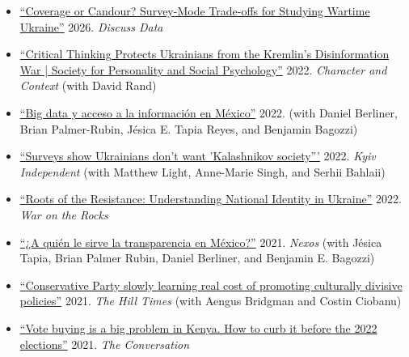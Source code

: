 \begin{itemize}[label={---},leftmargin=1.5em]
  \item \href{https://discuss-data.net/cs/eescca/section/blog/coverage-or-candour/}{``Coverage or Candour? Survey-Mode Trade-offs for Studying Wartime Ukraine''} 2026. \textit{Discuss Data}

  \item \href{https://spsp.org/news/character-and-context-blog/erlich-rand-critical-thinking-disinformation}{``Critical Thinking Protects Ukrainians from the Kremlin’s Disinformation War | Society for Personality and Social Psychology''} 2022. \textit{Character and Context} (with David Rand)

  \item \href{https://doi.org/10.31219/osf.io/nbqus}{``Big data y acceso a la información en México''} 2022. (with Daniel Berliner, Brian Palmer-Rubin, Jésica E. Tapia Reyes, and Benjamin Bagozzi)

  \item \href{https://kyivindependent.com/group-of-authors-surveys-show-ukrainians-dont-want-kalashnikov-society/}{``Surveys show Ukrainians don't want 'Kalashnikov society'''} 2022. \textit{Kyiv Independent} (with Matthew Light, Anne-Marie Singh, and Serhii Bahlaii)

  \item \href{https://warontherocks.com/2022/04/roots-of-the-resistance-understanding-national-identity-in-ukraine/}{``Roots of the Resistance: Understanding National Identity in Ukraine''} 2022. \textit{War on the Rocks}

  \item \href{https://redaccion.nexos.com.mx/a-quien-le-sirve-la-transparencia-en-mexico/}{``¿A quién le sirve la transparencia en México?''} 2021. \textit{Nexos} (with Jésica Tapia, Brian Palmer Rubin, Daniel Berliner, and Benjamin E. Bagozzi)

  \item \href{https://www.hilltimes.com/2021/06/30/conservative-party-slowly-learning-real-cost-of-promoting-culturally-divisive-policies/303970}{``Conservative Party slowly learning real cost of promoting culturally divisive policies''} 2021. \textit{The Hill Times} (with Aengus Bridgman and Costin Ciobanu)

  \item \href{http://theconversation.com/vote-buying-is-a-big-problem-in-kenya-how-to-curb-it-before-the-2022-elections-171630}{``Vote buying is a big problem in Kenya. How to curb it before the 2022 elections''} 2021. \textit{The Conversation}


\end{itemize}
